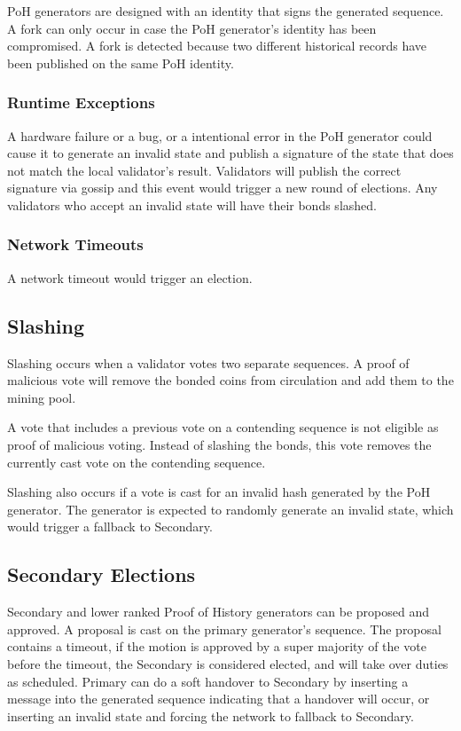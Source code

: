 \documentclass[12pt]{article}
\begin{document}
PoH generators are designed with an identity that signs the generated sequence. A fork can only occur in case the PoH generator’s identity has been compromised. A fork is detected because two different historical records have been published on the same PoH identity.

\subsubsection{Runtime Exceptions}
A hardware failure or a bug, or a intentional error in the PoH generator could cause it to generate an invalid state and publish a signature of the state that does not match the local validator’s result. Validators will publish the correct signature via gossip and this event would trigger a new round of elections. Any validators who accept an invalid state will have their bonds slashed.

\subsubsection{Network Timeouts}

A network timeout would trigger an election.

\subsection{Slashing}
Slashing occurs when a validator votes two separate sequences. A proof of malicious vote will remove the bonded coins from circulation and add them to the mining pool.

A vote that includes a previous vote on a contending sequence is not eligible as proof of malicious voting. Instead of slashing the bonds, this vote removes the currently cast vote on the contending sequence.

Slashing also occurs if a vote is cast for an invalid hash generated by the PoH generator. The generator is expected to randomly generate an invalid state, which would trigger a fallback to Secondary.
\subsection{Secondary Elections}
Secondary and lower ranked Proof of History generators can be proposed and approved. A proposal is cast on the primary generator’s sequence. The proposal contains a timeout, if the motion is approved by a super majority of the vote before the timeout, the Secondary is considered elected, and will take over duties as scheduled. Primary can do a soft handover to Secondary by inserting a message into the generated sequence indicating that a handover will occur, or inserting an invalid state and forcing the network to fallback to Secondary.
\end{document}
